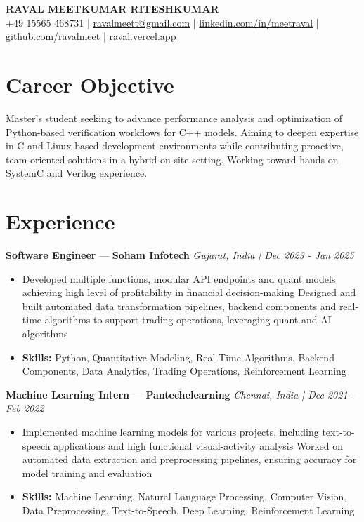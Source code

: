 \documentclass[a4paper,10pt]{article}
\begin{document}
\begin{center}
  {\Large\bfseries RAVAL MEETKUMAR RITESHKUMAR}\\[2pt]
  {\small +49 15565 468731 \;|\; \href{mailto:ravalmeett@gmail.com}{ravalmeett@gmail.com} \;|\; \href{https://www.linkedin.com/in/meetraval/}{linkedin.com/in/meetraval} \;|\; \href{https://github.com/ravalmeet}{github.com/ravalmeet} \;|\; \href{https://raval.vercel.app/}{raval.vercel.app}}
\end{center}
\vspace{-3pt}

\section*{Career Objective}
Master's student seeking to advance performance analysis and optimization of Python-based verification workflows for C++ models. Aiming to deepen expertise in C and Linux-based development environments while contributing proactive, team-oriented solutions in a hybrid on-site setting. Working toward hands-on SystemC and Verilog experience.\par

\section*{Experience}
\textbf{Software Engineer} — \textbf{Soham Infotech} \hfill \textit{Gujarat, India \;|\; Dec 2023 - Jan 2025}\par
\vspace{1pt}
\begin{itemize}
  \item Developed multiple functions, modular API endpoints and quant models achieving high level of profitability in financial decision-making Designed and built automated data transformation pipelines, backend components and real-time algorithms to support trading operations, leveraging quant and AI algorithms
  \item \textbf{Skills:} Python, Quantitative Modeling, Real-Time Algorithms, Backend Components, Data Analytics, Trading Operations, Reinforcement Learning
\end{itemize}
\vspace{3pt}
\textbf{Machine Learning Intern} — \textbf{Pantechelearning} \hfill \textit{Chennai, India \;|\; Dec 2021 - Feb 2022}\par
\vspace{1pt}
\begin{itemize}
  \item Implemented machine learning models for various projects, including text-to-speech applications and high functional visual-activity analysis Worked on automated data extraction and preprocessing pipelines, ensuring accuracy for model training and evaluation
  \item \textbf{Skills:} Machine Learning, Natural Language Processing, Computer Vision, Data Preprocessing, Text-to-Speech, Deep Learning, Reinforcement Learning
\end{itemize}
\end{document}

